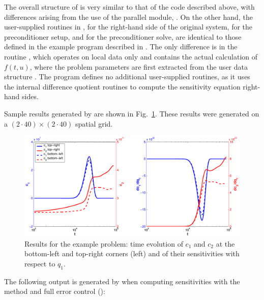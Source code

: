 The overall structure of  is very
similar to that of the code  described above, with 
differences arising from the use of the parallel {\nvector} module, {\nvecp}.
On the other hand, the user-supplied routines in ,
 for the right-hand side of the original system,
 for the preconditioner setup, and  for the
preconditioner solve, are identical to those defined in the example program
 described in \cite{cvode_ex}. The only difference is in the
routine , which operates on local data only and contains the actual 
calculation of $f(t,u)$, where the problem parameters are first extracted from the
user data structure . The program  defines no
additional user-supplied routines, as it uses the {\cvodes} internal difference quotient
routines to compute the sensitivity equation right-hand sides.

Sample results generated by  are shown in
Fig.~\ref{f:cvsDiurnal_FSA_kry_p}. 
These results were generated on a $(2\cdot40)\times(2\cdot40)$ spatial grid.
\begin{figure}
  {\centerline{\includegraphics[width=\textwidth]{cvsfwdkryx_p}}}
  \caption{Results for the  example problem:
    time evolution of $c_1$ and $c_2$ at the bottom-left and top-right corners
    (left) and of their sensitivities with respect to $q_1$.}
  \label{f:cvsDiurnal_FSA_kry_p}
\end{figure}
The following output is generated by  when computing
sensitivities with the  method and full error
control ():

